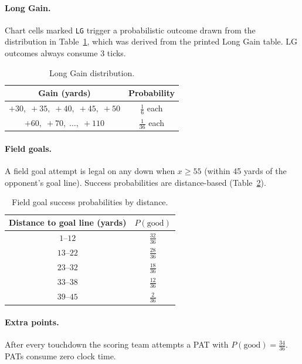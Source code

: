 \documentclass[11pt,letterpaper]{article}
\begin{document}
\paragraph{Long Gain.}
Chart cells marked \texttt{LG} trigger a probabilistic outcome drawn from the distribution
in Table~\ref{tab:lg}, which was derived from the printed Long Gain table.  LG outcomes
always consume 3 ticks.

\begin{table}[ht]
\centering
\caption{Long Gain distribution.}
\label{tab:lg}
\begin{tabular}{cc}
\toprule
Gain (yards) & Probability \\
\midrule
$+30,\;+35,\;+40,\;+45,\;+50$ & $\tfrac{1}{6}$ each \\
$+60,\;+70,\;\ldots,\;+110$ & $\tfrac{1}{36}$ each \\
\bottomrule
\end{tabular}
\end{table}

\paragraph{Field goals.}
A field goal attempt is legal on any down when $x \geq 55$ (within 45 yards of the
opponent's goal line).  Success probabilities are distance-based (Table~\ref{tab:fg}).

\begin{table}[ht]
\centering
\caption{Field goal success probabilities by distance.}
\label{tab:fg}
\begin{tabular}{cc}
\toprule
Distance to goal line (yards) & $P(\text{good})$ \\
\midrule
$1$--$12$   & $\tfrac{32}{36}$ \\
$13$--$22$  & $\tfrac{28}{36}$ \\
$23$--$32$  & $\tfrac{18}{36}$ \\
$33$--$38$  & $\tfrac{12}{36}$ \\
$39$--$45$  & $\tfrac{2}{36}$  \\
\bottomrule
\end{tabular}
\end{table}

\paragraph{Extra points.}
After every touchdown the scoring team attempts a PAT with $P(\text{good}) = \tfrac{34}{36}$.
PATs consume zero clock time.
\end{document}
